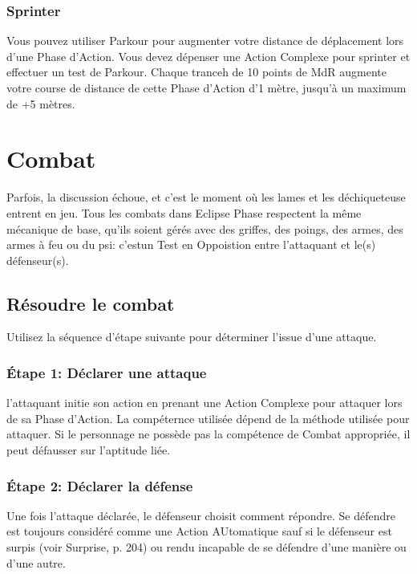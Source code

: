 \subsubsection{Sprinter} 

Vous pouvez utiliser Parkour pour augmenter votre distance de déplacement lors d'une Phase d'Action. Vous devez dépenser une Action Complexe pour sprinter et effectuer un test de Parkour. Chaque tranceh de 10 points de MdR augmente votre course de distance de cette Phase d'Action d'1 mètre, jusqu'à un maximum de +5 mètres. 

\section{Combat} \label{sec:combat} 

Parfois, la discussion échoue, et c'est le moment où les lames et les déchiqueteuse entrent en jeu. Tous les combats dans Eclipse Phase respectent la même mécanique de base, qu'ils soient gérés avec des griffes, des poings, des armes, des armes à feu ou du psi: c'estun Test en Oppoistion entre l'attaquant et le(s) défenseur(s). 

\subsection{Résoudre le combat} 

Utilisez la séquence d'étape suivante pour déterminer l'issue d'une attaque. 

\subsubsection{Étape 1: Déclarer une attaque} 

l'attaquant initie son action en prenant une Action Complexe pour attaquer lors de sa Phase d'Action. La compéternce utilisée dépend de la méthode utilisée pour attaquer. Si le personnage ne possède pas la compétence de Combat appropriée, il peut défausser sur l'aptitude liée. 

\subsubsection{Étape 2: Déclarer la défense} 

Une fois l'attaque déclarée, le défenseur choisit comment répondre. Se défendre est toujours considéré comme une Action AUtomatique sauf si le défenseur est surpis (voir Surprise, p. 204) ou rendu incapable de se défendre d'une manière ou d'une autre. 

